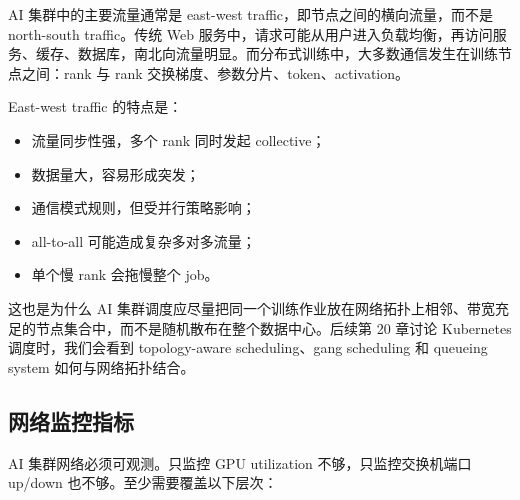 AI 集群中的主要流量通常是 east-west traffic，即节点之间的横向流量，而不是 north-south traffic。传统 Web 服务中，请求可能从用户进入负载均衡，再访问服务、缓存、数据库，南北向流量明显。而分布式训练中，大多数通信发生在训练节点之间：rank 与 rank 交换梯度、参数分片、token、activation。

East-west traffic 的特点是：

\begin{itemize}
  \item 流量同步性强，多个 rank 同时发起 collective；
  \item 数据量大，容易形成突发；
  \item 通信模式规则，但受并行策略影响；
  \item all-to-all 可能造成复杂多对多流量；
  \item 单个慢 rank 会拖慢整个 job。
\end{itemize}

这也是为什么 AI 集群调度应尽量把同一个训练作业放在网络拓扑上相邻、带宽充足的节点集合中，而不是随机散布在整个数据中心。后续第 20 章讨论 Kubernetes 调度时，我们会看到 topology-aware scheduling、gang scheduling 和 queueing system 如何与网络拓扑结合。

\subsection{网络监控指标}
\label{subsec:network-monitoring-metrics}

AI 集群网络必须可观测。只监控 GPU utilization 不够，只监控交换机端口 up/down 也不够。至少需要覆盖以下层次：

